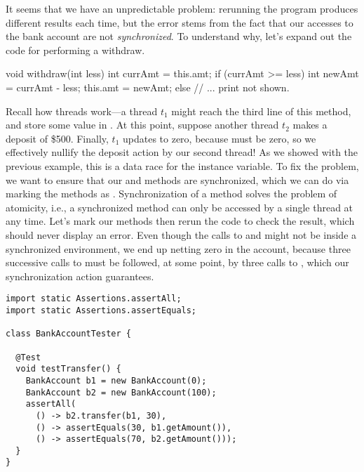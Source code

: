 It seems that we have an unpredictable problem: rerunning the program produces different results each time, but the error stems from the fact that our accesses to the bank account are not \emph{synchronized}. To understand why, let's expand out the code for performing a withdraw.

\begin{verbnobox}[\small]
void withdraw(int less) {
  int currAmt = this.amt;
  if (currAmt >= less) {
    int newAmt = currAmt - less;
    this.amt = newAmt;
  } else {
    // ... print not shown.
  }
}
\end{verbnobox}

\begin{sloppypar}{Recall how threads work---a thread $t_1$ might reach the third line of this method, and store some value in . At this point, suppose another thread $t_2$ makes a deposit of \$500. Finally, $t_1$ updates  to zero, because  must be zero, so we effectively nullify the deposit action by our second thread! As we showed with the previous example, this is a data race for the  instance variable. To fix the problem, we want to ensure that our  and  methods are synchronized, which we can do via marking the methods as . Synchronization of a method solves the problem of atomicity, i.e., a synchronized method can only be accessed by a single thread at any time. Let's mark our methods then rerun the code to check the result, which should never display an error. Even though the calls to  and  might not be inside a synchronized environment, we end up netting zero in the account, because three successive calls to  must be followed, at some point, by three calls to , which our synchronization action guarantees.}
\end{sloppypar}


\begin{lstlisting}[language=MyJava]
import static Assertions.assertAll;
import static Assertions.assertEquals;

class BankAccountTester {

  @Test
  void testTransfer() {
    BankAccount b1 = new BankAccount(0);
    BankAccount b2 = new BankAccount(100);
    assertAll(
      () -> b2.transfer(b1, 30),
      () -> assertEquals(30, b1.getAmount()),
      () -> assertEquals(70, b2.getAmount()));
  }
}
\end{lstlisting}

